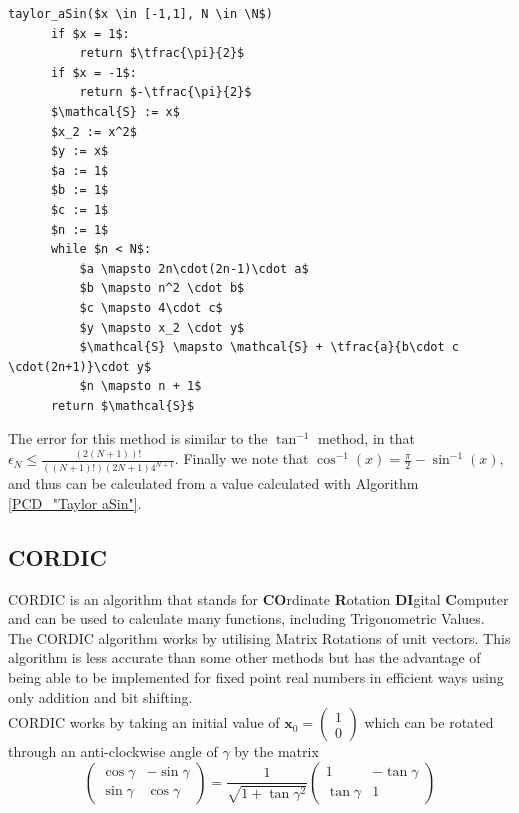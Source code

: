 {%
\begin{lstlisting}[caption={Taylor Method for \(\sin^{-1}\)},label={PCD_"Taylor aSin"}]
  taylor_aSin($x \in [-1,1], N \in \N$)
      if $x = 1$:
          return $\tfrac{\pi}{2}$
      if $x = -1$:
          return $-\tfrac{\pi}{2}$
      $\mathcal{S} := x$
      $x_2 := x^2$
      $y := x$
      $a := 1$
      $b := 1$
      $c := 1$
      $n := 1$
      while $n < N$:
          $a \mapsto 2n\cdot(2n-1)\cdot a$
          $b \mapsto n^2 \cdot b$
          $c \mapsto 4\cdot c$
          $y \mapsto x_2 \cdot y$
          $\mathcal{S} \mapsto \mathcal{S} + \tfrac{a}{b\cdot c \cdot(2n+1)}\cdot y$
          $n \mapsto n + 1$
      return $\mathcal{S}$
\end{lstlisting}

The error for this method is similar to the \(\tan^{-1}\) method, in that \(\epsilon_N \le \frac{(2(N+1))!}{((N+1)!)(2N+1)4^{N+1}}\). Finally we note that \(\cos^{-1}(x) = \tfrac{\pi}{2} - \sin^{-1}(x)\), and thus can be calculated from a value calculated with Algorithm \ref{PCD_"Taylor aSin"}.

\subsection{CORDIC}
\label{SUB_"CORDIC"}

\theoremstyle{plain}
\newtheorem{Cordic Gamma Property}{Proposition}[subsection]
\newtheorem{Cordic Accuracy}[Cordic Gamma Property]{Proposition}

CORDIC is an algorithm that stands for \textbf{CO}rdinate \textbf{R}otation \textbf{DI}gital \textbf{C}omputer\cite[][138]{BOK_CalcBook} and can be used to calculate many functions, including Trigonometric Values. The CORDIC algorithm works by utilising Matrix Rotations of unit vectors. This algorithm is less accurate than some other methods but has the advantage of being able to be implemented for fixed point real numbers in efficient ways using only addition and bit shifting.\\

CORDIC works by taking an initial value of
\begin{math}
	\mathbf{x}_0 = \left( 
		\begin{array}{c}
			1 \\
			0
		\end{array} \right)
\end{math}
which can be rotated through an anti-clockwise angle of \(\gamma\) by the matrix
\begin{displaymath}
	\left( \begin{array}{cc}
		\cos{\gamma} & -\sin{\gamma} \\
		\sin{\gamma} &  \cos{\gamma}
	\end{array} \right)
	= \frac{1}{\sqrt{1 + \tan{\gamma}^2}} \left( \begin{array}{cc}
		1 & -\tan{\gamma} \\
		\tan{\gamma} & 1
	\end{array} \right)
\end{displaymath}

}
